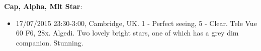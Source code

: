 {\bf Cap, Alpha, Mlt Star}:
\begin{itemize}
\item 17/07/2015 23:30-3:00, Cambridge, UK. 1 - Perfect seeing, 5 - Clear. Tele Vue 60 F6, 28x. Algedi. Two lovely bright stars, one of which has a grey dim companion. Stunning.
\end{itemize}

